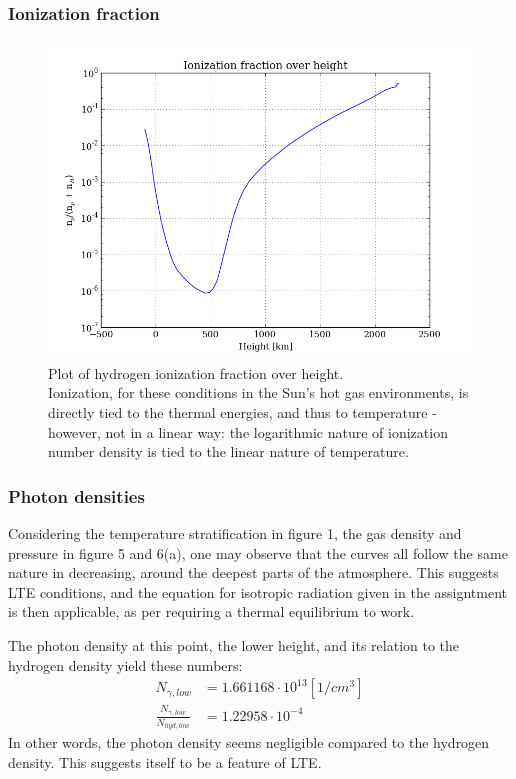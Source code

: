 \documentclass[11pt,a4paper,notitlepage]{article}
\begin{document}
\subsubsection{Ionization fraction}

\begin{figure}[H]
\center

	\includegraphics[scale=0.42]{../figs/ion_frac.png}
	\caption{Plot of hydrogen ionization fraction over height.\\
	Ionization, for these conditions in the Sun's hot gas environments, is directly tied to the thermal energies, and thus to temperature - however, not in a linear way: the logarithmic nature of ionization number density is tied to the linear nature of temperature.}
\end{figure}

\subsubsection{Photon densities}
Considering the temperature stratification in figure 1, the gas density and pressure in figure 5 and 6(a), one may observe that the curves all follow the same nature in decreasing, around the deepest parts of the atmosphere. This suggests LTE conditions, and the equation for isotropic radiation given in the assigntment is then applicable, as per requiring a thermal equilibrium to work.

The photon density at this point, the lower height, and its relation to the hydrogen density yield these numbers:
\begin{align*}
N_{\gamma,low} &= 1.661168 \cdot 10^{13} [1/cm^3]\\
\frac{N_{\gamma,low}}{N_{hyd,low}} &= 1.22958 \cdot 10^{-4}
\end{align*}
In other words, the photon density seems negligible compared to the hydrogen density. This suggests itself to be a feature of LTE.
\end{document}
